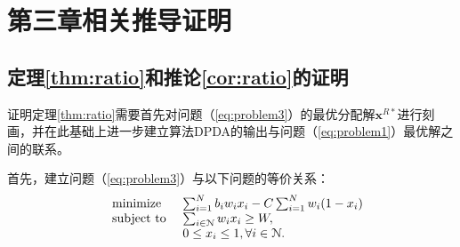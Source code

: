 \chapter{第三章相关推导证明}
\section{定理\ref{thm:ratio}和推论\ref{cor:ratio}的证明}\label{pf:thm:ratio}
证明定理\ref{thm:ratio}需要首先对问题（\ref{eq:problem3}）的最优分配解$\mathbf{x}^{R*}$进行刻画，并在此基础上进一步建立算法DPDA的输出与问题（\ref{eq:problem1}）最优解之间的联系。
	
	首先，建立问题（\ref{eq:problem3}）与以下问题的等价关系：
	\begin{equation}%
	\hspace{-0.0cm}
	\begin{array}
	[c]{lll}%
	&{\text{minimize}}&~\sum_{i=1}^{N}b_iw_ix_i-C\sum_{i=1}^{N}w_i(1-x_i)
	\\
	&\text{subject to}&~ \sum_{i\in\N}w_ix_i\ge W,\\
	&&~ 0\le x_i\le 1, \forall i\in\N.
	\end{array}
	\label{eq:problem4}
	\end{equation}
	
